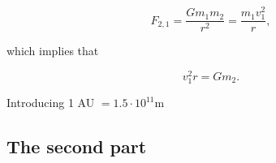\documentclass[%
 reprint,
 nobalance,
 amsmath,amssymb,
 aps,
]{revtex4-1}
\begin{document}
\begin{equation}
	F_{2,1} = \frac{Gm_1 m_2}{r^2} = \frac{m_1 v_{1}^{2}}{r},
\end{equation}

which implies that

\begin{equation}
	v_{1}^{2}r = G m_2.
\end{equation}

Introducing 1 AU $= 1.5\cdot10^{11}$m



\subsection{\label{sec:Sec}The second part}
\end{document}
